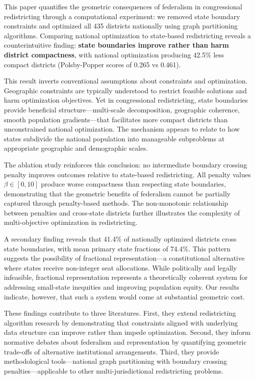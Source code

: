 
This paper quantifies the geometric consequences of federalism in congressional redistricting through a computational experiment: we removed state boundary constraints and optimized all 435 districts nationally using graph partitioning algorithms. Comparing national optimization to state-based redistricting reveals a counterintuitive finding: \textbf{state boundaries improve rather than harm district compactness}, with national optimization producing 42.5\% less compact districts (Polsby-Popper scores of 0.265 vs 0.461).

This result inverts conventional assumptions about constraints and optimization. Geographic constraints are typically understood to restrict feasible solutions and harm optimization objectives. Yet in congressional redistricting, state boundaries provide beneficial structure---multi-scale decomposition, geographic coherence, smooth population gradients---that facilitates more compact districts than unconstrained national optimization. The mechanism appears to relate to how states subdivide the national population into manageable subproblems at appropriate geographic and demographic scales.

The ablation study reinforces this conclusion: no intermediate boundary crossing penalty improves outcomes relative to state-based redistricting. All penalty values $ \beta \in [0, 10] $ produce worse compactness than respecting state boundaries, demonstrating that the geometric benefits of federalism cannot be partially captured through penalty-based methods. The non-monotonic relationship between penalties and cross-state districts further illustrates the complexity of multi-objective optimization in redistricting.

A secondary finding reveals that 41.4\% of nationally optimized districts cross state boundaries, with mean primary state fractions of 74.4\%. This pattern suggests the possibility of fractional representation---a constitutional alternative where states receive non-integer seat allocations. While politically and legally infeasible, fractional representation represents a theoretically coherent system for addressing small-state inequities and improving population equity. Our results indicate, however, that such a system would come at substantial geometric cost.

These findings contribute to three literatures. First, they extend redistricting algorithm research by demonstrating that constraints aligned with underlying data structure can improve rather than impede optimization. Second, they inform normative debates about federalism and representation by quantifying geometric trade-offs of alternative institutional arrangements. Third, they provide methodological tools---national graph partitioning with boundary crossing penalties---applicable to other multi-jurisdictional redistricting problems.

